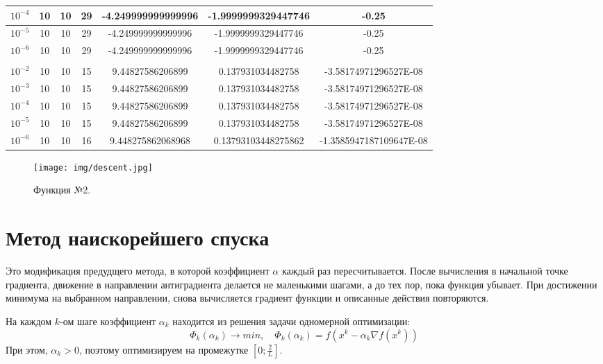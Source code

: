 \documentclass[12pt]{article}
\begin{document}
\begin{table}[H]
\begin{tabular}{|c|c|c|c|c|c|c|}
$10^{-4}$ & 10 & 10 & 29    & -4.249999999999996  & -1.9999999329447746 & -0.25                   \\ \hline
$10^{-5}$ & 10 & 10 & 29    & -4.249999999999996  & -1.9999999329447746 & -0.25                   \\ \hline
$10^{-6}$ & 10 & 10 & 29    & -4.249999999999996  & -1.9999999329447746 & -0.25                   \\ \hline
\rowcolor[HTML]{FFF0DB} 
\multicolumn{7}{|c|}{\cellcolor[HTML]{FFF0DB}$29x^2+18y^2-8x+10$}                                 \\ \hline
$10^{-2}$ & 10 & 10 & 15    & 9.44827586206899    & 0.137931034482758   & -3.58174971296527E-08   \\ \hline
$10^{-3}$ & 10 & 10 & 15    & 9.44827586206899    & 0.137931034482758   & -3.58174971296527E-08   \\ \hline
$10^{-4}$ & 10 & 10 & 15    & 9.44827586206899    & 0.137931034482758   & -3.58174971296527E-08   \\ \hline
$10^{-5}$ & 10 & 10 & 15    & 9.44827586206899    & 0.137931034482758   & -3.58174971296527E-08   \\ \hline
$10^{-6}$ & 10 & 10 & 16    & 9.448275862068968   & 0.13793103448275862 & -1.3585947187109647E-08 \\ \hline
\end{tabular}
\end{table}

\begin{figure}[H]
	\centering
	\texttt{[image: img/descent.jpg]}
	\caption{Функция №2.}
\end{figure}

\newpage
\section{Метод наискорейшего спуска}

Это модификация предудщего метода, в которой коэффициент $\alpha$ каждый раз пересчитывается. После вычисления в начальной точке градиента, движение в направлении антиградиента делается не маленькими шагами, а до тех пор, пока функция убывает. При достижении минимума на выбранном направлении, снова вычисляется градиент функции и описанные действия повторяются.

На каждом $k$-ом шаге коэффициент $\alpha_k$ находится из решения задачи одномерной оптимизации:
\[ \Phi_k (\alpha_k) \rightarrow min, \quad  \Phi_k (\alpha_k) = f(x^k - \alpha_k \nabla f(x^k)) \]
При этом, $\alpha_k > 0$, поэтому оптимизируем на промежутке $\left[ 0; \frac{2}{L} \right]$.
\end{document}
